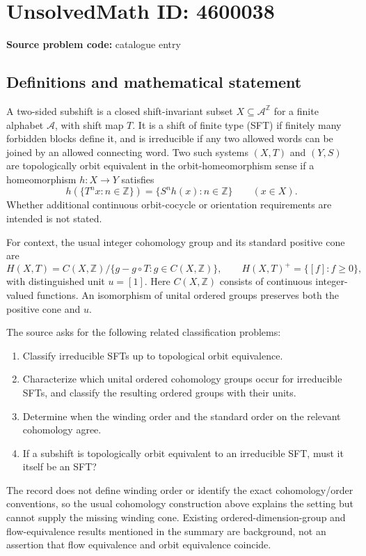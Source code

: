 \documentclass[11pt]{article}
\begin{document}
\section*{UnsolvedMath ID: 4600038}
\textbf{Source problem code:} catalogue entry
\subsection{Definitions and mathematical statement}
A two-sided subshift is a closed shift-invariant subset $X\subseteq\mathcal A^{\mathbb Z}$ for a finite alphabet $\mathcal A$, with shift map $T$. It is a shift of finite type (SFT) if finitely many forbidden blocks define it, and is irreducible if any two allowed words can be joined by an allowed connecting word. Two such systems $(X,T)$ and $(Y,S)$ are topologically orbit equivalent in the orbit-homeomorphism sense if a homeomorphism $h:X\to Y$ satisfies
\[
h(\{T^n x:n\in\mathbb Z\})=\{S^n h(x):n\in\mathbb Z\}\qquad(x\in X).
\]
Whether additional continuous orbit-cocycle or orientation requirements are intended is not stated.

For context, the usual integer cohomology group and its standard positive cone are
\[
H(X,T)=C(X,\mathbb Z)/\{g-g\circ T:g\in C(X,\mathbb Z)\},\qquad
H(X,T)^+=\{[f]:f\geq0\},
\]
with distinguished unit $u=[1]$. Here $C(X,\mathbb Z)$ consists of continuous integer-valued functions. An isomorphism of unital ordered groups preserves both the positive cone and $u$.

The source asks for the following related classification problems:
\begin{enumerate}
\item Classify irreducible SFTs up to topological orbit equivalence.
\item Characterize which unital ordered cohomology groups occur for irreducible SFTs, and classify the resulting ordered groups with their units.
\item Determine when the winding order and the standard order on the relevant cohomology agree.
\item If a subshift is topologically orbit equivalent to an irreducible SFT, must it itself be an SFT?
\end{enumerate}
The record does not define winding order or identify the exact cohomology/order conventions, so the usual cohomology construction above explains the setting but cannot supply the missing winding cone. Existing ordered-dimension-group and flow-equivalence results mentioned in the summary are background, not an assertion that flow equivalence and orbit equivalence coincide.
\end{document}
